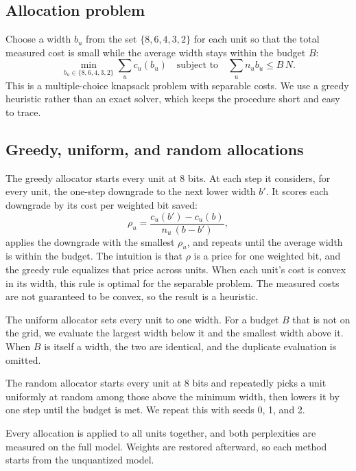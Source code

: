 \documentclass[11pt]{article}
\begin{document}
\subsection{Allocation problem}

Choose a width $b_u$ from the set $\{8, 6, 4, 3, 2\}$ for each unit so that the total measured cost is small while the average width stays within the budget $B$:
\begin{equation}
\min_{b_u \in \{8,6,4,3,2\}} \sum_u c_u(b_u) \quad \text{subject to} \quad \sum_u n_u b_u \le B\, N.
\end{equation}
This is a multiple-choice knapsack problem with separable costs. We use a greedy heuristic rather than an exact solver, which keeps the procedure short and easy to trace.

\subsection{Greedy, uniform, and random allocations}

The greedy allocator starts every unit at 8 bits. At each step it considers, for every unit, the one-step downgrade to the next lower width $b'$. It scores each downgrade by its cost per weighted bit saved:
\begin{equation}
\rho_u = \frac{c_u(b') - c_u(b)}{n_u\,(b - b')},
\end{equation}
applies the downgrade with the smallest $\rho_u$, and repeats until the average width is within the budget. The intuition is that $\rho$ is a price for one weighted bit, and the greedy rule equalizes that price across units. When each unit's cost is convex in its width, this rule is optimal for the separable problem. The measured costs are not guaranteed to be convex, so the result is a heuristic.

The uniform allocator sets every unit to one width. For a budget $B$ that is not on the grid, we evaluate the largest width below it and the smallest width above it. When $B$ is itself a width, the two are identical, and the duplicate evaluation is omitted.

The random allocator starts every unit at 8 bits and repeatedly picks a unit uniformly at random among those above the minimum width, then lowers it by one step until the budget is met. We repeat this with seeds 0, 1, and 2.

Every allocation is applied to all units together, and both perplexities are measured on the full model. Weights are restored afterward, so each method starts from the unquantized model.
\end{document}
